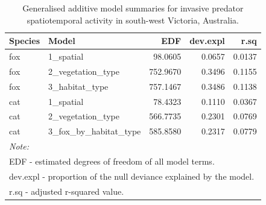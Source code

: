 \documentclass[preprint, 3p, authoryear]{elsarticle} %
\begin{document}
\begin{longtable}[t]{llrrr}
\caption{\label{tab:diel-tab-fits}Generalised additive model summaries for invasive predator spatiotemporal activity in south-west Victoria, Australia.}\\
\toprule
Species & Model & EDF & dev.expl & r.sq\\
\midrule
fox & 1\_spatial & 98.0605 & 0.0657 & 0.0137\\
fox & 2\_vegetation\_type & 752.9670 & 0.3496 & 0.1155\\
fox & 3\_habitat\_type & 757.1467 & 0.3486 & 0.1138\\
cat & 1\_spatial & 78.4323 & 0.1110 & 0.0367\\
cat & 2\_vegetation\_type & 566.7735 & 0.2301 & 0.0769\\
\addlinespace
cat & 3\_fox\_by\_habitat\_type & 585.8580 & 0.2317 & 0.0779\\
\bottomrule
\multicolumn{5}{l}{\rule{0pt}{1em}\textit{Note: }}\\
\multicolumn{5}{l}{\rule{0pt}{1em}EDF - estimated degrees of freedom of all model terms.}\\
\multicolumn{5}{l}{\rule{0pt}{1em}dev.expl - proportion of the null deviance explained by the model. }\\
\multicolumn{5}{l}{\rule{0pt}{1em}r.sq -  adjusted r-squared value.}\\
\end{longtable}
\endgroup{}

\newpage
\end{document}
